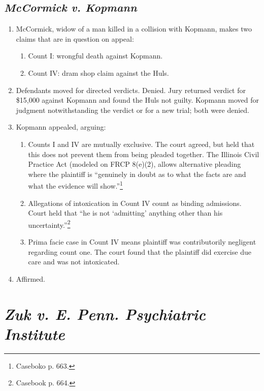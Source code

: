 \subsection{\emph{McCormick v. Kopmann}}

\begin{enumerate}
    \item McCormick, widow of a man killed in a collision with Kopmann, makes two claims that are in question on appeal:
    \begin{enumerate}
        \item Count I: wrongful death against Kopmann.
        \item Count IV: dram shop claim against the Huls.
    \end{enumerate}
    \item Defendants moved for directed verdicts. Denied. Jury returned verdict for \$15,000 against Kopmann and found the Huls not guilty. Kopmann moved for judgment notwithstanding the verdict or for a new trial; both were denied. 
    \item Kopmann appealed, arguing:
    \begin{enumerate}
        \item Counts I and IV are mutually exclusive. The court agreed, but held that this does not prevent them from being pleaded together. The Illinois Civil Practice Act (modeled on FRCP 8(e)(2), allows alternative pleading where the plaintiff is ``genuinely in doubt as to what the facts are and what the evidence will show.''\footnote{Caseboko p. 663.}
        \item Allegations of intoxication in Count IV count as binding admissions. Court held that ``he is not `admitting' anything other than his uncertainty.''\footnote{Casebook p. 664.}
        \item Prima facie case in Count IV means plaintiff was contributorily negligent regarding count one. The court found that the plaintiff did exercise due care and was not intoxicated.
    \end{enumerate}
    \item Affirmed.
\end{enumerate}

\section{\emph{Zuk v. E. Penn. Psychiatric Institute}}


